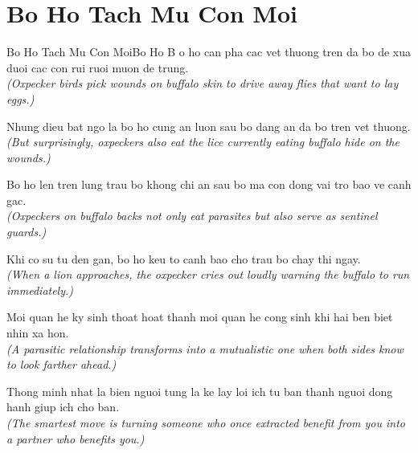 \section{Bo Ho Tach Mu Con Moi}
\begin{truyen}{Bo Ho Tach Mu Con Moi}{Bo Ho}
B o ho can pha cac vet thuong tren da bo de xua duoi cac con rui ruoi muon de trung.\\
\textit{(Oxpecker birds pick wounds on buffalo skin to drive away flies that want to lay eggs.)}

Nhung dieu bat ngo la bo ho cung an luon sau bo dang an da bo tren vet thuong.\\
\textit{(But surprisingly, oxpeckers also eat the lice currently eating buffalo hide on the wounds.)}

Bo ho len tren lung trau bo khong chi an sau bo ma con dong vai tro bao ve canh gac.\\
\textit{(Oxpeckers on buffalo backs not only eat parasites but also serve as sentinel guards.)}

Khi co su tu den gan, bo ho keu to canh bao cho trau bo chay thi ngay.\\
\textit{(When a lion approaches, the oxpecker cries out loudly warning the buffalo to run immediately.)}

Moi quan he ky sinh thoat hoat thanh moi quan he cong sinh khi hai ben biet nhin xa hon.\\
\textit{(A parasitic relationship transforms into a mutualistic one when both sides know to look farther ahead.)}

\end{truyen}
\begin{baihoc}
  Thong minh nhat la bien nguoi tung la ke lay loi ich tu ban thanh nguoi dong hanh giup ich cho ban.\\
  \textit{(The smartest move is turning someone who once extracted benefit from you into a partner who benefits you.)}
\end{baihoc}

